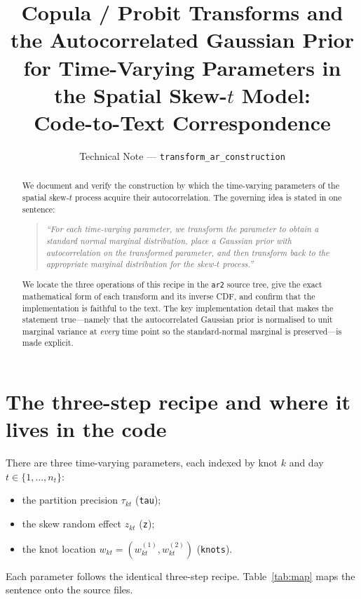 \documentclass[11pt]{article}
\title{
  Copula / Probit Transforms and the Autocorrelated Gaussian Prior\\
  for Time-Varying Parameters in the Spatial Skew-$t$ Model:\\
  Code-to-Text Correspondence
}
\author{Technical Note --- \texttt{transform\_ar\_construction}}
\date{}
\theoremstyle{definition}
\newcommand{\code}[1]{\texttt{#1}}
\begin{document}
\maketitle

\begin{abstract}
We document and verify the construction by which the time-varying parameters of
the spatial skew-$t$ process acquire their autocorrelation. The governing idea is
stated in one sentence:
\begin{quote}
\emph{``For each time-varying parameter, we transform the parameter to obtain a
standard normal marginal distribution, place a Gaussian prior with autocorrelation
on the transformed parameter, and then transform back to the appropriate marginal
distribution for the skew-$t$ process.''}
\end{quote}
We locate the three operations of this recipe in the \code{ar2} source tree, give
the exact mathematical form of each transform and its inverse CDF, and confirm
that the implementation is faithful to the text. The key implementation detail
that makes the statement true---namely that the autocorrelated Gaussian prior is
normalised to unit marginal variance at \emph{every} time point so the
standard-normal marginal is preserved---is made explicit.
\end{abstract}

\section{The three-step recipe and where it lives in the code}
\label{sec:recipe}

There are three time-varying parameters, each indexed by knot $k$ and day
$t\in\{1,\dots,n_t\}$:
\begin{itemize}[nosep]
  \item the partition precision $\tau_{kt}$ (\code{tau});
  \item the skew random effect $z_{kt}$ (\code{z});
  \item the knot location $w_{kt}=(w_{kt}^{(1)},w_{kt}^{(2)})$ (\code{knots}).
\end{itemize}
Each parameter follows the identical three-step recipe. Table~\ref{tab:map}
maps the sentence onto the source files.
\end{document}
